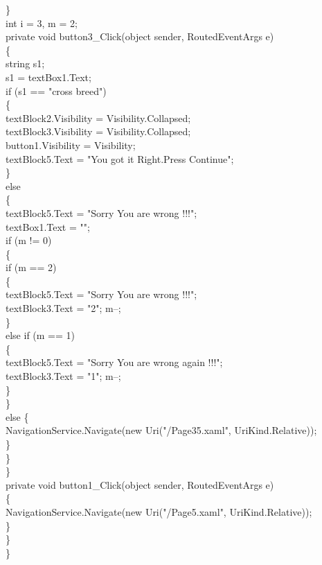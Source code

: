 {{        \}\\
        int i = 3, m = 2;\\
        private void button3_Click(object sender, RoutedEventArgs e)\\
        \{\\
            string s1;\\
            s1 = textBox1.Text;\\
            if (s1 == "cross breed")\\
            \{\\
                textBlock2.Visibility = Visibility.Collapsed;\\
                textBlock3.Visibility = Visibility.Collapsed;\\
                button1.Visibility = Visibility;\\
                textBlock5.Text = "You got it Right.Press Continue";\\
                
           \}\\
            else\\
            \{\\
                textBlock5.Text = "Sorry You are wrong !!!";\\
                textBox1.Text = "";\\
                if (m != 0)\\
                \{\\

                    if (m == 2)\\
                    \{\\
                        
                        textBlock5.Text = "Sorry You are wrong !!!";\\
                        textBlock3.Text = "2"; m--;\\
                    \}\\
                    else if (m == 1)\\
                    \{\\
                        textBlock5.Text = "Sorry You are wrong again !!!";\\
                        textBlock3.Text = "1"; m--;\\
                    \}\\
                \}\\
                else
                \{\\
                    NavigationService.Navigate(new Uri("/Page35.xaml", UriKind.Relative));\\
                \}\\
            \}\\
        \}\\
        private void button1_Click(object sender, RoutedEventArgs e)\\
        \{\\
            NavigationService.Navigate(new Uri("/Page5.xaml", UriKind.Relative));\\
        \}\\
    \}\\
\}\\


}}
